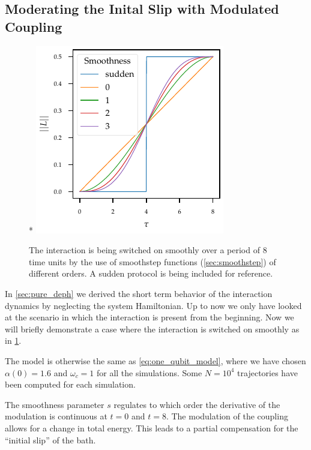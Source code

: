 \subsection{Moderating the Inital Slip with Modulated Coupling}%
\label{sec:moder-init-slip}
\begin{figure}*
  \centering
  \includegraphics{figs/one_bath_mod/modulation_protocols_init.pdf}
  \caption{\label{fig:L_mod_init} The interaction is being switched on
    smoothly over a period of \(8\) time units by the use of
    smoothstep functions (\cref{sec:smoothstep}) of different
    orders. A sudden protocol is being included for reference.}
\end{figure}
In \cref{sec:pure_deph} we derived the short term behavior of the
interaction dynamics by neglecting the system Hamiltonian. Up to now
we only have looked at the scenario in which the interaction is
present from the beginning. Now we will briefly demonstrate a case
where the interaction is switched on smoothly as in
\cref{fig:L_mod_init}.

The model is otherwise the same as \cref{eq:one_qubit_model}, where we
have chosen \(α(0)=1.6\) and \(ω_{c}=1\) for all the simulations. Some
\(N=10^{4}\) trajectories have been computed for each simulation.

The smoothness parameter \(s\) regulates to which order the derivative
of the modulation is continuous at \(t=0\) and \(t=8\). The modulation
of the coupling allows for a change in total energy. This leads to a
partial compensation for the ``initial slip'' of the bath.

